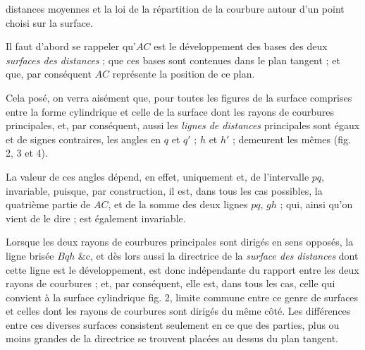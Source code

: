\documentclass[11pt,a4paper]{article}
\begin{document}

distances moyennes et la loi de la répartition de la courbure autour
d'un point choisi sur la surface.

Il faut d'abord se rappeler qu'$AC$ est le développement des bases des
deux \emph{surfaces des distances} ; que ces bases sont contenues dans
le plan tangent ; et que, par conséquent $AC$ représente la position
de ce plan.

Cela posé, on verra aisément que, pour toutes les figures de la
surface comprises entre la forme cylindrique et celle de la surface
dont les rayons de courbures principales, et, par conséquent, aussi
les \emph{lignes de distances} principales sont égaux et de signes
contraires, les angles en $q$ et $q'$ ; $h$ et $h'$ ; demeurent les
mêmes (fig. 2, 3 et 4).

La valeur de ces angles dépend, en effet, uniquement et, de
l'intervalle $pq$, invariable, puisque, par construction, il est, dans
tous les cas possibles, la quatrième partie de $AC$, et de la somme
des deux lignes $pq$, $gh$ ; qui, ainsi qu'on vient de le dire ; est
également invariable.

Lorsque les deux rayons de courbures principales sont dirigés en sens
opposés, la ligne brisée $Bqh$ \&c, et dès lors aussi la directrice de
la \emph{surface des distances} dont cette ligne est le développement,
est donc indépendante du rapport entre les deux rayons de courbures ;
et, par conséquent, elle est, dans tous les cas, celle qui convient à
la surface cylindrique fig. 2, limite commune entre ce genre de
surfaces et celles dont les rayons de courbures sont dirigés du même
côté. Les différences entre ces diverses surfaces consistent seulement
en ce que des parties, plus ou moins grandes de la directrice se
trouvent placées au dessus du plan tangent.
\end{document}
